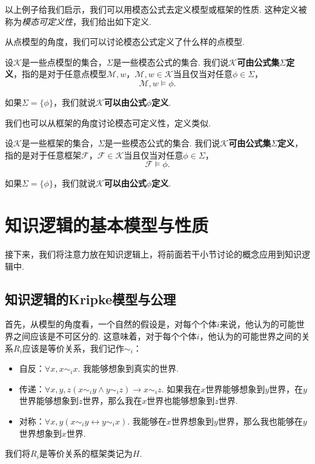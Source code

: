 以上例子给我们启示，我们可以用模态公式去定义模型或框架的性质. 这种定义被称为\textit{模态可定义性}，我们给出如下定义. 

从点模型的角度，我们可以讨论模态公式定义了什么样的点模型. 

\begin{definition}[点模型可定义性]
设$\mathcal{K}$是一些点模型的集合，$\Sigma$是一些模态公式的集合. 我们说\textbf{$\mathcal{K}$可由公式集$\Sigma$定义}，指的是对于任意点模型$\mathcal{M}, w$，$\mathcal{M}, w \in \mathcal{K}$当且仅当对任意$\phi\in\Sigma$，
\[ \mathcal{M}, w \vDash \phi. \]

如果$\Sigma = \{\phi\}$，我们就说\textbf{$\mathcal{K}$可以由公式$\phi$定义}. 
\end{definition}

我们也可以从框架的角度讨论模态可定义性，定义类似. 

\begin{definition}[框架可定义性]
设$\mathcal{K}$是一些框架的集合，$\Sigma$是一些模态公式的集合. 我们说\textbf{$\mathcal{K}$可由公式集$\Sigma$定义}，指的是对于任意框架$\mathcal{F}$，$\mathcal{F} \in \mathcal{K}$当且仅当对任意$\phi\in\Sigma$，
\[ \mathcal{F} \vDash \phi. \]

如果$\Sigma = \{\phi\}$，我们就说\textbf{$\mathcal{K}$可以由公式$\phi$定义}. 
\end{definition}

\section{知识逻辑的基本模型与性质}\label{sec:epistemic-logic-basic-model}

接下来，我们将注意力放在知识逻辑上，将前面若干小节讨论的概念应用到知识逻辑中. 

\subsection{知识逻辑的Kripke模型与公理}

首先，从模型的角度看，一个自然的假设是，对每个个体$i$来说，他认为的可能世界之间应该是不可区分的. 这意味着，对于每个个体$i$，他认为的可能世界之间的关系$R_i$应该是等价关系，我们记作$\sim_i$：

\begin{itemize}
    \item 自反：$\forall x,x\sim_ix$. 我能够想象到真实的世界. 
    \item 传递：$\forall x,y,z(x\sim_iy\wedge y\sim_iz)\to x\sim_iz$. 如果我在$x$世界能够想象到$y$世界，在$y$世界能够想象到$z$世界，那么我在$x$世界也能够想象到$z$世界. 
    \item 对称：$\forall x,y(x \sim_i y\leftrightarrow y\sim_ix)$. 我能够在$x$世界想象到$y$世界，那么我也能够在$y$世界想象到$x$世界. 
\end{itemize}
我们将$R_i$是等价关系的框架类记为$H$. 

